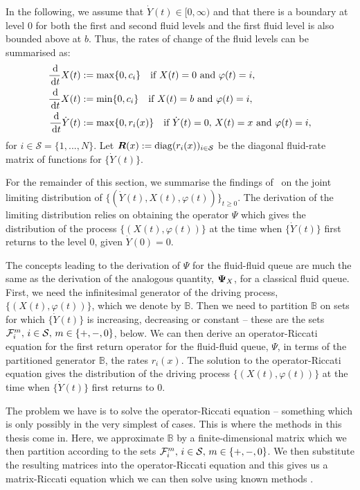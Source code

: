 In the following, we assume that $\dot Y(t) \in [0,\infty)$ and that there is a boundary at level $0$ for both the first and second fluid levels and the first fluid level is also bounded above at \(b\). Thus, the rates of change of the fluid levels can be summarised as:
% 
	\begin{align*} 
		\frac{\, \mathrm{d}}{\, \mathrm{d} t}  X(t) & := \max\{0, c_i\} \quad \mbox{if }  X(t) = 0 \mbox{ and } \varphi(t) = i, \\
		\frac{\, \mathrm{d}}{\, \mathrm{d} t}  X(t) & := \min\{0, c_i\} \quad \mbox{if }  X(t) = b \mbox{ and } \varphi(t) = i, \\
          	\frac{\, \mathrm{d}}{\, \mathrm{d} t} \dot Y(t) & := \max\{0, r_i(x)\} \quad \mbox{if } \dot Y(t) = 0,\, X(t) = x \mbox{ and } \varphi(t) = i, 	
	\end{align*} 
for $i \in \mathcal{S} = \{1,...,N\}$. Let $\boldsymbol R(x) := \mathrm{diag}(r_i(x))_{i \in \mathcal{S}}$ be the diagonal fluid-rate matrix of functions for $\{\dot Y(t)\}$. 

For the remainder of this section, we summarise the findings of~\cite{bo2014} on the joint limiting distribution of $\{( \dot Y(t), X(t), \varphi(t))\}_{t \geq 0}$. The derivation of the limiting distribution relies on obtaining the operator \(\mathbb \Psi\) which gives the distribution of the process \(\{(X(t),\varphi(t))\}\) at the time when \(\{\dot Y(t)\}\) first returns to the level 0, given \(\dot Y(0)=0\).

The concepts leading to the derivation of \( {\mathbb \Psi}\) for the fluid-fluid queue are much the same as the derivation of the analogous quantity, \(\boldsymbol\Psi_X\), for a classical fluid queue. First, we need the infinitesimal generator of the driving process, \(\{(X(t),\varphi(t))\}\), which we denote by \(\mathbb B\). Then we need to partition \(\mathbb B\) on sets for which \(\{\dot Y(t)\}\) is increasing, decreasing or constant -- these are the sets \(\mathcal F_i^m,\, i\in\mathcal{S},\,m\in\{+,-,0\}\), below. We can then derive an operator-Riccati equation for the first return operator for the fluid-fluid queue, \(\mathbb \Psi\), in terms of the partitioned generator \(\mathbb B\), the rates \(r_i(x)\). The solution to the operator-Riccati equation gives the distribution of the driving process \(\{(X(t),\varphi(t))\}\) at the time when \(\{\dot Y(t)\}\) first returns to \(0\). 

The problem we have is to solve the operator-Riccati equation -- something which is only possibly in the very simplest of cases. This is where the methods in this thesis come in. Here, we approximate \(\mathbb B\) by a finite-dimensional matrix which we then partition according to the sets \(\mathcal F_i^m,\, i\in\mathcal{S},\,m\in\{+,-,0\}\). We then substitute the resulting matrices into the operator-Riccati equation and this gives us a matrix-Riccati equation which we can then solve using known methods \cite{bot08}. 

